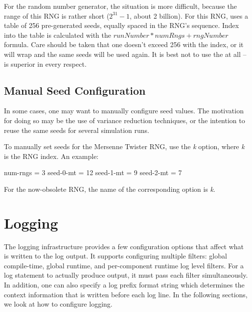 For the  random number generator, the situation is more difficult,
because the range of this RNG is rather short ($2^{31}-1$, about 2 billion).
For this RNG, {\opp} uses a table of 256 pre-generated seeds, equally spaced
in the RNG's sequence. Index into the table is calculated with the
$runNumber*numRngs + rngNumber$ formula. Care should be taken that
one doesn't exceed 256 with the index, or it will wrap and the
same seeds will be used again. It is best not to use the 
at all --  is superior in every respect.


\subsection{Manual Seed Configuration}
\label{sec:config-sim:manual-seed-configuration}

In some cases, one may want to manually configure seed values. The
motivation for doing so may be the use of variance reduction techniques, or
the intention to reuse the same seeds for several simulation runs.

To manually set seeds for the Mersenne Twister RNG, use the \textit{k}
option, where \textit{k} is the RNG index. An example:

\begin{inifile}
[General]
num-rngs = 3
seed-0-mt = 12
seed-1-mt = 9
seed-2-mt = 7
\end{inifile}

\label{sec:config-sim:seedtool}

For the now-obsolete  RNG, the name of the corresponding option is
\textit{k}.

\section{Logging}
\label{sec:config-sim:logging}

The {\opp} logging infrastructure provides a few configuration options that
affect what is written to the log output. It supports configuring multiple
filters: global compile-time, global runtime, and per-component runtime log
level filters. For a log statement to actually produce output, it must pass
each filter simultaneously. In addition, one can also specify a log prefix
format string which determines the context information that is written before
each log line. In the following sections, we look at how to configure logging.

